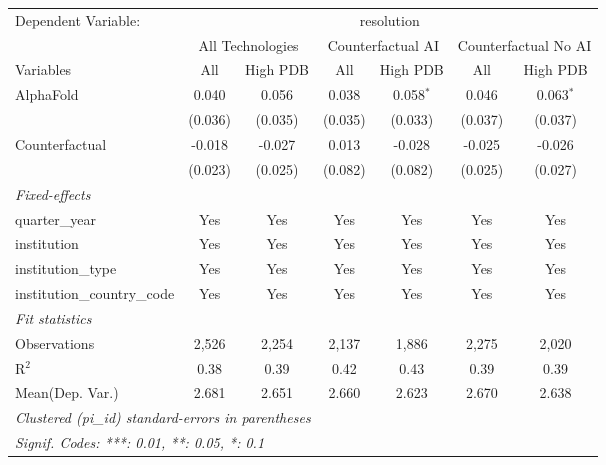 \begingroup
\centering
\begin{tabular}{lcccccc}
   \tabularnewline \midrule \midrule
   Dependent Variable: & \multicolumn{6}{c}{resolution}\\
 & \multicolumn{2}{c}{All Technologies} & \multicolumn{2}{c}{Counterfactual AI} & \multicolumn{2}{c}{Counterfactual No AI} \\
\cmidrule(lr){1-1}\cmidrule(lr){2-3} \cmidrule(lr){4-5} \cmidrule(lr){6-7}
Variables & \multicolumn{1}{c}{All} & \multicolumn{1}{c}{High PDB} & \multicolumn{1}{c}{All} & \multicolumn{1}{c}{High PDB} & \multicolumn{1}{c}{All} & \multicolumn{1}{c}{High PDB} \\
\cmidrule(lr){1-1}\cmidrule(lr){2-2} \cmidrule(lr){3-3} \cmidrule(lr){4-4} \cmidrule(lr){5-5} \cmidrule(lr){6-6} \cmidrule(lr){7-7}
   AlphaFold                    & 0.040   & 0.056   & 0.038   & 0.058$^{*}$ & 0.046   & 0.063$^{*}$\\   
                                & (0.036) & (0.035) & (0.035) & (0.033)     & (0.037) & (0.037)\\   
   Counterfactual               & -0.018  & -0.027  & 0.013   & -0.028      & -0.025  & -0.026\\   
                                & (0.023) & (0.025) & (0.082) & (0.082)     & (0.025) & (0.027)\\   
   \midrule
   \emph{Fixed-effects}\\
   quarter\_year                & Yes     & Yes     & Yes     & Yes         & Yes     & Yes\\  
   institution                  & Yes     & Yes     & Yes     & Yes         & Yes     & Yes\\  
   institution\_type            & Yes     & Yes     & Yes     & Yes         & Yes     & Yes\\  
   institution\_country\_code   & Yes     & Yes     & Yes     & Yes         & Yes     & Yes\\  
   \midrule
   \emph{Fit statistics}\\
   Observations                 & 2,526   & 2,254   & 2,137   & 1,886       & 2,275   & 2,020\\  
   R$^2$                        & 0.38    & 0.39    & 0.42    & 0.43        & 0.39    & 0.39\\  
Mean(Dep. Var.) & 2.681 & 2.651 & 2.660 & 2.623 & 2.670 & 2.638 \\
   \midrule \midrule
   \multicolumn{7}{l}{\emph{Clustered (pi\_id) standard-errors in parentheses}}\\
   \multicolumn{7}{l}{\emph{Signif. Codes: ***: 0.01, **: 0.05, *: 0.1}}\\
\end{tabular}
\par\endgroup
